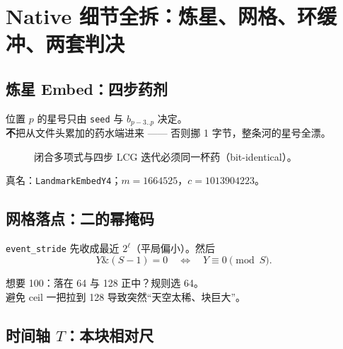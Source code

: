 \chapter{Native 细节全拆：炼星、网格、环缓冲、两套判决}
\label{ch:native-details}

\section{炼星 Embed：四步药剂}

\begin{metaphor}[炼金只看眼前四味药]
位置 $p$ 的星号只由 \texttt{seed} 与 $b_{p-3..p}$ 决定。\\
\textbf{不}把从文件头累加的药水端进来 —— 否则挪 1 字节，整条河的星号全漂。
\end{metaphor}

\begin{figure}[htbp]
\centering
{}
\caption{闭合多项式与四步 LCG 迭代必须同一杯药（bit-identical）。}
\label{fig:four-herbs}
\end{figure}

真名：\texttt{LandmarkEmbedY4}；$m=1664525$，$c=1013904223$。

\section{网格落点：二的幂掩码}

\texttt{event\_stride} 先收成最近 $2^\ell$（平局偏小）。然后
\begin{equation}
Y \mathbin{\&}(S-1)=0 \quad\Leftrightarrow\quad Y\equiv 0\pmod S.
\end{equation}

\begin{toybox}[平局偏小]
想要 100：落在 64 与 128 正中？规则选 64。\\
避免 ceil 一把拉到 128 导致突然``天空太稀、块巨大''。
\end{toybox}

\section{时间轴 $T$：本块相对尺}

